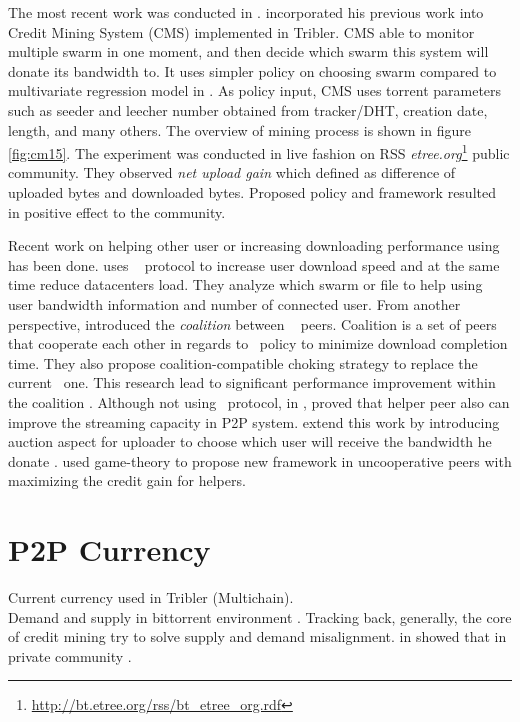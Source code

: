 The most recent work was conducted in \citeyear{2015:creditmining:capota}\cite{2015:creditmining:capota}. \citeauthor{2015:creditmining:capota} incorporated his previous work into Credit Mining System (CMS) implemented in Tribler. CMS able to monitor multiple swarm in one moment, and then decide which swarm this system will donate its bandwidth to. It uses simpler policy on choosing swarm compared to multivariate regression model in \cite{2013:investmentcm:capota}. As policy input, CMS uses torrent parameters such as seeder and leecher number obtained from tracker/DHT, creation date, length, and many others. The overview of mining process is shown in figure \ref{fig:cm15}. The experiment was conducted in live fashion on RSS \textit{etree.org}\footnote{\url{http://bt.etree.org/rss/bt\_etree\_org.rdf}} public community. They observed \textit{net upload gain} which defined as difference of uploaded bytes and downloaded bytes. Proposed policy and framework resulted in positive effect to the community.

Recent work on helping other user or increasing downloading performance using \bt~ has been done. \citeauthor{2014:cloudseed:leon} uses \bt~ protocol to increase user download speed and at the same time reduce datacenters load. They analyze which swarm or file to help using user bandwidth information and number of connected user\cite{2014:cloudseed:leon}. From another perspective, \citeauthor{2015:coalitionbt:zhang} introduced the \textit{coalition} between \bt~ peers. Coalition is a set of peers that cooperate each other in regards to \bt~policy to minimize download completion time. They also propose coalition-compatible choking strategy to replace the current \bt~one. This research lead to significant performance improvement within the coalition \cite{2015:coalitionbt:zhang}. Although not using \bt~protocol, in \citeyear{2009:p2phelp:he}, \citeauthor{2009:p2phelp:he} proved that helper peer also can improve the streaming capacity in P2P system\cite{2009:p2phelp:he}. \citeauthor{2016:gameauctionp2pstream:mostafavi} extend this work by introducing auction aspect for uploader to choose which user will receive the bandwidth he donate \cite{2016:gameauctionp2pstream:mostafavi}. \citeauthor{2016:gameauctionp2pstream:mostafavi} used game-theory to propose new framework in uncooperative peers with maximizing the credit gain for helpers.

\section{P2P Currency}
Current currency used in Tribler (Multichain)\cite{2015:multichain:norberhuis}.\\ Demand and supply in bittorrent environment \cite{2009:demandsupplyres:andrade}.
Tracking back, generally, the core of credit mining try to solve supply and demand misalignment. \citeauthor{2011:interswarm:capota} in \citeyear{2011:interswarm:capota} showed that in private community \cite{2011:interswarm:capota}.